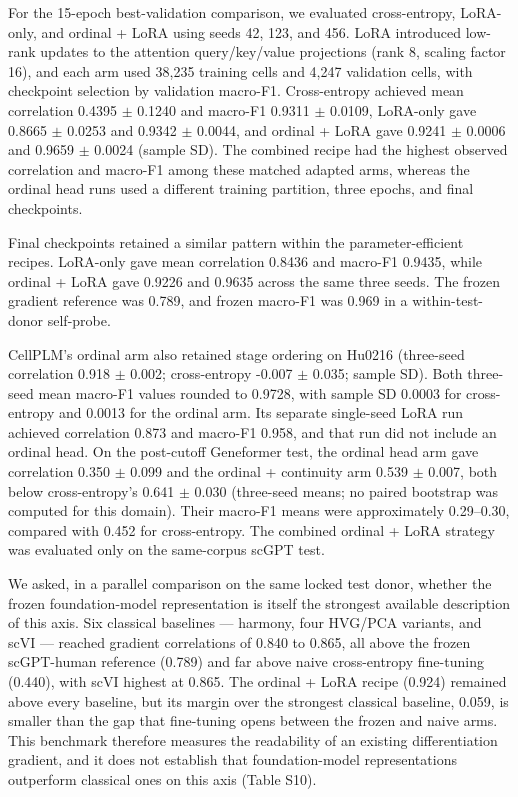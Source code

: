 \documentclass[12pt,letterpaper]{article}
\begin{document}
For the 15-epoch best-validation comparison, we evaluated cross-entropy, LoRA-only, and ordinal + LoRA using seeds 42, 123, and 456. LoRA introduced low-rank updates to the attention query/key/value projections (rank 8, scaling factor 16), and each arm used 38,235 training cells and 4,247 validation cells, with checkpoint selection by validation macro-F1. Cross-entropy achieved mean correlation 0.4395 $\pm$ 0.1240 and macro-F1 0.9311 $\pm$ 0.0109, LoRA-only gave 0.8665 $\pm$ 0.0253 and 0.9342 $\pm$ 0.0044, and ordinal + LoRA gave 0.9241 $\pm$ 0.0006 and 0.9659 $\pm$ 0.0024 (sample SD). The combined recipe had the highest observed correlation and macro-F1 among these matched adapted arms, whereas the ordinal head runs used a different training partition, three epochs, and final checkpoints.

Final checkpoints retained a similar pattern within the parameter-efficient recipes. LoRA-only gave mean correlation 0.8436 and macro-F1 0.9435, while ordinal + LoRA gave 0.9226 and 0.9635 across the same three seeds. The frozen gradient reference was 0.789, and frozen macro-F1 was 0.969 in a within-test-donor self-probe.

CellPLM's ordinal arm also retained stage ordering on Hu0216 (three-seed correlation 0.918 $\pm$ 0.002; cross-entropy -0.007 $\pm$ 0.035; sample SD). Both three-seed mean macro-F1 values rounded to 0.9728, with sample SD 0.0003 for cross-entropy and 0.0013 for the ordinal arm. Its separate single-seed LoRA run achieved correlation 0.873 and macro-F1 0.958, and that run did not include an ordinal head. On the post-cutoff Geneformer test, the ordinal head arm gave correlation 0.350 $\pm$ 0.099 and the ordinal + continuity arm 0.539 $\pm$ 0.007, both below cross-entropy's 0.641 $\pm$ 0.030 (three-seed means; no paired bootstrap was computed for this domain). Their macro-F1 means were approximately 0.29--0.30, compared with 0.452 for cross-entropy. The combined ordinal + LoRA strategy was evaluated only on the same-corpus scGPT test.

We asked, in a parallel comparison on the same locked test donor, whether the frozen foundation-model representation is itself the strongest available description of this axis. Six classical baselines --- harmony, four HVG/PCA variants, and scVI --- reached gradient correlations of 0.840 to 0.865, all above the frozen scGPT-human reference (0.789) and far above naive cross-entropy fine-tuning (0.440), with scVI highest at 0.865. The ordinal + LoRA recipe (0.924) remained above every baseline, but its margin over the strongest classical baseline, 0.059, is smaller than the gap that fine-tuning opens between the frozen and naive arms. This benchmark therefore measures the readability of an existing differentiation gradient, and it does not establish that foundation-model representations outperform classical ones on this axis (Table S10).
\end{document}

